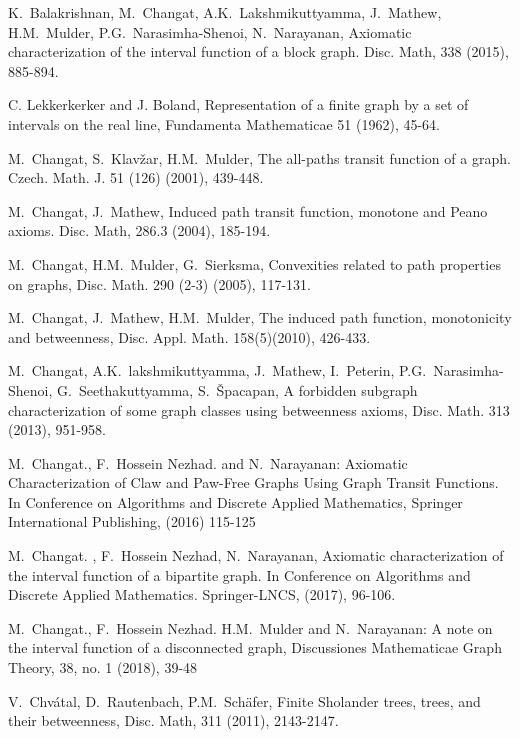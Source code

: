 \documentclass[10pt,a4paper]{article}
\begin{document}
\begin{thebibliography}{99}






 K.~Balakrishnan, M.~Changat, A.K.~Lakshmikuttyamma, J.~Mathew, H.M.~Mulder, P.G.~Narasimha-Shenoi, N.~Narayanan, Axiomatic characterization of the interval function of a block graph. Disc. Math, 338 (2015), 885-894.


C. Lekkerkerker and J. Boland, Representation of a finite graph by a set of intervals on the real line, Fundamenta Mathematicae 51 (1962), 45-64.

 M.~Changat, S.~Klav\v{z}ar, H.M.~Mulder, The all-paths transit function of a graph. Czech. Math. J. 51 (126) (2001), 439-448.


 M.~Changat, J.~Mathew, Induced path transit function, monotone and Peano axioms. Disc. Math, 286.3 (2004), 185-194. 
                             
 M.~Changat, H.M.~Mulder, G.~Sierksma, Convexities related
to path properties on graphs, Disc. Math. 290 (2-3) (2005), 117-131. 
   
 M.~Changat, J.~Mathew, H.M.~Mulder, The induced path function, monotonicity and betweenness, Disc. Appl. Math. 158(5)(2010), 426-433.
  
 M.~Changat, A.K.~lakshmikuttyamma, J.~Mathew, I.~Peterin, P.G.~Narasimha-Shenoi, G.~Seethakuttyamma, S.~\v{S}pacapan, A forbidden
subgraph characterization of some graph classes using betweenness axioms, Disc. Math. 313 (2013), 951-958.

 M.~Changat., F.~Hossein Nezhad. and N.~Narayanan: Axiomatic Characterization of Claw and Paw-Free Graphs Using Graph Transit Functions. In Conference on Algorithms and Discrete Applied Mathematics, Springer International Publishing, (2016) 115-125


 M.~Changat. , F.~Hossein Nezhad, N.~Narayanan, Axiomatic characterization of the interval function of a bipartite graph. In Conference on Algorithms and Discrete Applied Mathematics. Springer-LNCS, (2017), 96-106.

M.~Changat., F.~Hossein Nezhad. H.M.~Mulder and N.~Narayanan: A note on the interval function of a disconnected graph, Discussiones Mathematicae Graph Theory, 38, no. 1 (2018), 39-48

V.~Chv\'{a}tal, D.~Rautenbach, P.M.~Sch\"{a}fer, Finite Sholander trees, trees, and their betweenness, Disc. Math, 311 (2011), 2143-2147.


\end{thebibliography}
\end{document}
